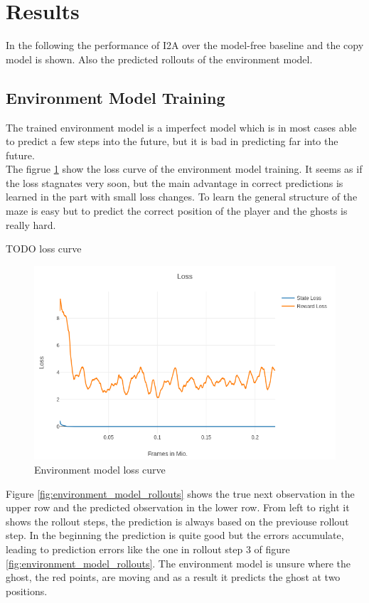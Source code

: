 \section{Results}

In the following the performance of I2A over the model-free baseline and the copy model is shown. Also the predicted rollouts of the environment model.

\subsection{Environment Model Training}

The trained environment model is a imperfect model which is in most cases able to predict a few steps into the future, but it is bad in predicting far into the future.\\

The figrue \ref{fig:env_model_loss} show the loss curve of the environment model training. It seems as if the loss stagnates very soon, but the main advantage in correct predictions is learned in the part with small loss changes. To learn the general structure of the maze is easy but to predict the correct position of the player and the ghosts is really hard.

TODO loss curve
\begin{figure}[H] 
  \centering   
  \includegraphics[width=0.9\columnwidth]{./Images/hunt_environment_model_loss.png}
  \caption{Environment model loss curve} 
  \label{fig:env_model_loss} 
\end{figure} 


Figure \ref{fig:environment_model_rollouts} shows the true next observation in the upper row and the predicted observation in the lower row. From left to right it shows the rollout steps, the prediction is always based on the previouse rollout step. In the beginning the prediction is quite good but the errors accumulate, leading to prediction errors like the one in rollout step 3 of figure \ref{fig:environment_model_rollouts}. The environment model is unsure where the ghost, the red points, are moving and as a result it predicts the ghost at two positions.

